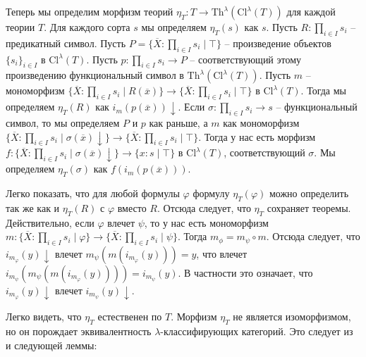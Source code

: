 \documentclass[reqno]{amsart}
\theoremstyle{definition}
\theoremstyle{remark}
\newcommand{\fs}[1]{\mathrm{#1}}
\begin{document}
Теперь мы определим морфизм теорий $\eta_T : T \to \fs{Th}^\lambda(\fs{Cl}^\lambda(T))$ для каждой теории $T$.
Для каждого сорта $s$ мы определяем $\eta_T(s)$ как $s$.
Пусть $R : \prod_{i \in I} s_i$ -- предикатный символ.
Пусть $P = \{ \overline{X} : \prod_{i \in I} s_i \mid \top \}$ -- произведение объектов $\{ s_i \}_{i \in I}$ в $\fs{Cl}^\lambda(T)$.
Пусть $p : \prod_{i \in I} s_i \to P$ -- соответствующий этому произведению функциональный символ в $\fs{Th}^\lambda(\fs{Cl}^\lambda(T))$.
Пусть $m$ -- мономорфизм $\{ \overline{X} : \prod_{i \in I} s_i \mid R(\overline{x}) \} \to \{ \overline{X} : \prod_{i \in I} s_i \mid \top \}$ в $\fs{Cl}^\lambda(T)$.
Тогда мы определяем $\eta_T(R)$ как $i_m(p(\overline{x}))\!\downarrow$.
Если $\sigma : \prod_{i \in I} s_i \to s$ -- функциональный символ, то мы определяем $P$ и $p$ как раньше,
а $m$ как мономорфизм $\{ \overline{X} : \prod_{i \in I} s_i \mid \sigma(\overline{x})\!\downarrow \} \to \{ \overline{X} : \prod_{i \in I} s_i \mid \top \}$.
Тогда у нас есть морфизм $f : \{ \overline{X} : \prod_{i \in I} s_i \mid \sigma(\overline{x})\!\downarrow \} \to \{ x : s \mid \top \}$ в $\fs{Cl}^\lambda(T)$, соответствующий $\sigma$.
Мы определяем $\eta_T(\sigma)$ как $f(i_m(p(\overline{x})))$.

Легко показать, что для любой формулы $\varphi$ формулу $\eta_T(\varphi)$ можно определить так же как и $\eta_T(R)$ с $\varphi$ вместо $R$.
Отсюда следует, что $\eta_T$ сохраняет теоремы.
Действительно, если $\varphi$ влечет $\psi$, то у нас есть мономорфизм $m : \{ \overline{X} : \prod_{i \in I} s_i \mid \varphi \} \to \{ \overline{X} : \prod_{i \in I} s_i \mid \psi \}$.
Тогда $m_\phi = m_\psi \circ m$.
Отсюда следует, что $i_{m_\varphi}(y)\!\downarrow$ влечет $m_\psi(m(i_{m_\varphi}(y))) = y$, что влечет $i_{m_\psi}(m_\psi(m(i_{m_\varphi}(y)))) = i_{m_\psi}(y)$.
В частности это означает, что $i_{m_\varphi}(y)\!\downarrow$ влечет $i_{m_\psi}(y)\!\downarrow$.

Легко видеть, что $\eta_T$ естественен по $T$.
Морфизм $\eta_T$ не является изоморфизмом, но он порождает эквивалентность $\lambda$-классифирующих категорий.
Это следует из  и следующей леммы:
\end{document}
